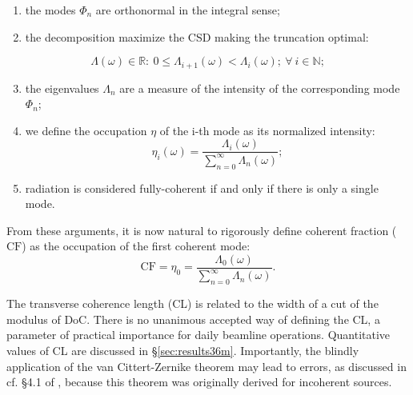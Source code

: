 \documentclass{iucr}              %
\begin{document}
\begin{enumerate}[label=(\roman*)]
\item the modes $\Phi_n$ are orthonormal in the integral sense;
\item the decomposition maximize the CSD making the truncation optimal:
\end{enumerate}
\begin{equation*}
\Lambda(\omega) \in \mathbb{R}
:~0\leq \Lambda_{i+1}(\omega)<\Lambda_i(\omega);~\forall~i \in \mathbb{N};
\end{equation*}
\begin{enumerate}[label=(\roman*)]
\setcounter{enumi}{2}
\item the eigenvalues $\Lambda_n$ are a measure of the intensity of the corresponding mode $\Phi_{n}$; 
\item we define the occupation $\eta$ of the i-th mode as its normalized intensity: 
\begin{equation}
\eta_i(\omega) =\frac{\Lambda_i(\omega)}{\sum\limits_{n=0}^\infty{\Lambda_n(\omega)}};
\end{equation}
\item radiation is considered fully-coherent if and only if there is only a single mode.
\end{enumerate}

From these arguments, it is now natural to rigorously define coherent fraction ($\text{CF}$) as the occupation of the first coherent mode:
\begin{equation}
\text{CF}=\eta_0=\frac{\Lambda_0(\omega)}{\sum\limits_{n=0}^\infty{\Lambda_n(\omega)}}. \label{eq:CF2D}
\end{equation}


The transverse coherence length (CL) is related to the width of a cut of the modulus of DoC. There is no unanimous accepted way of defining the CL, a parameter of practical importance for daily beamline operations. Quantitative values of CL are discussed in \S{\ref{sec:results36m}}. Importantly, the blindly application of the van Cittert-Zernike theorem may lead to errors, as discussed in cf. §4.1 of \cite{geloni2008}, because this theorem was originally derived for incoherent sources. 
\end{document}
